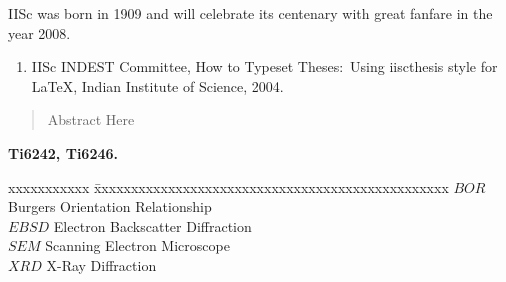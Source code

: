 \begin{frontmatter}
\vita
IISc was born in 1909 and will celebrate its centenary with great fanfare
in the year 2008.
\publications

\begin{enumerate}
\item IISc INDEST Committee,  How to Typeset Theses:~Using iiscthesis
style for \LaTeX, Indian Institute of Science, 2004.
\end{enumerate}

\begin{abstract}
Abstract Here
	
\end{abstract}



\makecontents

\keywords
{\large\bf{
Ti6242, Ti6246.
}}

\vspace{10MM}
\notations
\begin{singlespace}
\begin{tabbing}
xxxxxxxxxxx \= xxxxxxxxxxxxxxxxxxxxxxxxxxxxxxxxxxxxxxxxxxxxxxxx \kill
\textbf{$BOR$}   \> Burgers Orientation Relationship \\
\textbf{$EBSD$}  \> Electron Backscatter Diffraction  \\
\textbf{$SEM$}   \> Scanning Electron Microscope \\
\textbf{$XRD$}   \> X-Ray Diffraction \\
\end{tabbing}
\end{singlespace}
\end{frontmatter}

